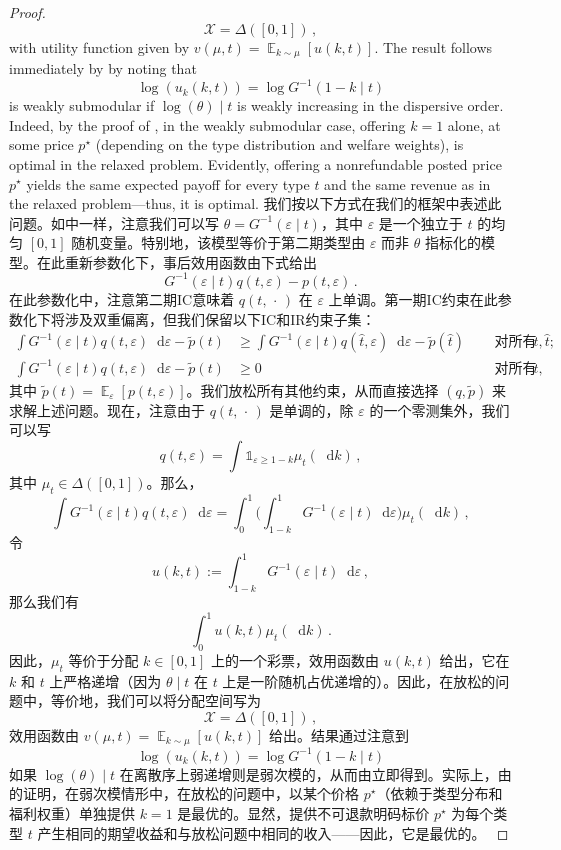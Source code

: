 \documentclass[12pt,letterpaper]{article}
\newenvironment{original}{\color{black}\noindent}{}
\newenvironment{translation}{\color{blue}\noindent}{}
\theoremstyle{plain}
\theoremstyle{definition}
\theoremstyle{remark}
\DeclareMathOperator{\E}{\mathds{E}}
\renewcommand{\1}{\mathds{1}}
\renewcommand*\d{\mathop{}\!\mathrm{d}}
\newcommand{\X}{\mathcal{X}}
\theoremstyle{definition}
\begin{document}
\begin{proof}
\begin{original}
\[\X = \Delta([0, 1])\,,\]
with utility function given by $v(\mu, t) = \E_{k \sim \mu}[u(k, t)]$. The result follows immediately by  by noting that
\[\log(u_{k}(k, t)) = \log G^{-1}(1 - k \mid t)\]
is weakly submodular if $\log(\theta) \mid t$ is weakly increasing in the dispersive order. Indeed, by the proof of , in the weakly submodular case, offering $k=1$ alone, at some price $p^\star$ (depending on the type distribution and welfare weights), is optimal in the relaxed problem. Evidently, offering a nonrefundable posted price $p^\star$ yields the same expected payoff for every type $t$ and the same revenue as in the relaxed problem---thus, it is optimal.
\end{original}
\begin{translation}
我们按以下方式在我们的框架中表述此问题。如\citet{Eso2007}中一样，注意我们可以写 $\theta = G^{-1}(\varepsilon \mid t)$，其中 $\varepsilon$ 是一个独立于 $t$ 的均匀 $[0, 1]$ 随机变量。特别地，该模型等价于第二期类型由 $\varepsilon$ 而非 $\theta$ 指标化的模型。在此重新参数化下，事后效用函数由下式给出
\[G^{-1}(\varepsilon \mid t) q(t, \varepsilon) - p(t, \varepsilon)\,.\]
在此参数化中，注意第二期IC意味着 $q(t, \,\cdot\,)$ 在 $\varepsilon$ 上单调。第一期IC约束在此参数化下将涉及双重偏离，但我们保留以下IC和IR约束子集：
\begin{align*}
\int G^{-1}(\varepsilon \mid t) q(t, \varepsilon) \d \varepsilon - \tilde{p}(t) &\geq \int G^{-1}(\varepsilon \mid t) q(\hat{t}, \varepsilon) \d \varepsilon - \tilde{p}(\hat{t}) \, && \text{ 对所有 $t, \hat{t}$;}\\
\int G^{-1}(\varepsilon \mid t) q(t, \varepsilon) \d \varepsilon - \tilde{p}(t) &\geq 0 && \text{ 对所有 $t$,}
\end{align*}
其中 $\tilde{p}(t) = \E_\varepsilon[p(t, \varepsilon)]$。我们放松所有其他约束，从而直接选择 $(q, \tilde{p})$ 来求解上述问题。现在，注意由于 $q(t, \,\cdot\,)$ 是单调的，除 $\varepsilon$ 的一个零测集外，我们可以写
\[q(t, \varepsilon) = \int \1_{\varepsilon \geq 1-k} \mu_t(\d k)\,,\]
其中 $\mu_t \in \Delta([0, 1])$。那么，
\[\int G^{-1}(\varepsilon \mid t) q(t, \varepsilon) \d \varepsilon = \int_0^1 \Big(\int^{1}_{1-k} G^{-1}(\varepsilon \mid t)\d \varepsilon\Big) \mu_t(\d k) \,,\]
令
\[u(k, t):= \int^{1}_{1 - k} G^{-1}(\varepsilon \mid t)\d \varepsilon\,,\]
那么我们有
\[\int_0^1 u(k, t) \mu_t(\d k) \,.\]
因此，$\mu_t$ 等价于分配 $k \in [0, 1]$ 上的一个彩票，效用函数由 $u(k, t)$ 给出，它在 $k$ 和 $t$ 上严格递增（因为 $\theta \mid t$ 在 $t$ 上是一阶随机占优递增的）。因此，在放松的问题中，等价地，我们可以将分配空间写为
\[\X = \Delta([0, 1])\,,\]
效用函数由 $v(\mu, t) = \E_{k \sim \mu}[u(k, t)]$ 给出。结果通过注意到
\[\log(u_{k}(k, t)) = \log G^{-1}(1 - k \mid t)\]
如果 $\log(\theta) \mid t$ 在离散序上弱递增则是弱次模的，从而由立即得到。实际上，由的证明，在弱次模情形中，在放松的问题中，以某个价格 $p^\star$（依赖于类型分布和福利权重）单独提供 $k=1$ 是最优的。显然，提供不可退款明码标价 $p^\star$ 为每个类型 $t$ 产生相同的期望收益和与放松问题中相同的收入——因此，它是最优的。
\end{translation}
\end{proof}
\end{document}
